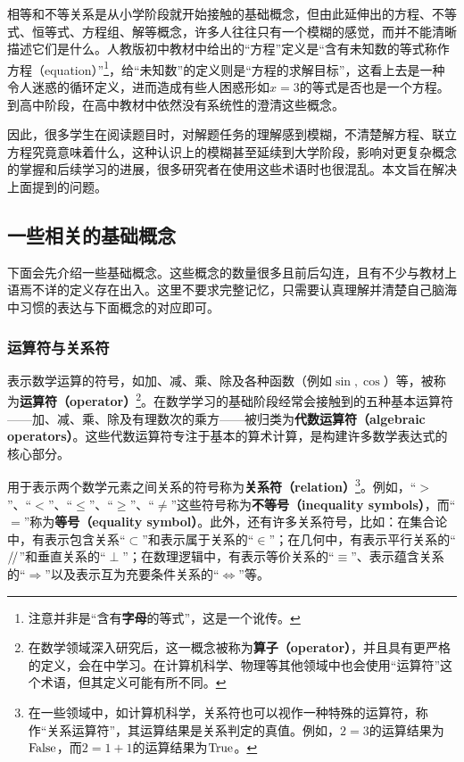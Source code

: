 
\begin{issues}
\issueDraft
\end{issues}


相等和不等关系是从小学阶段就开始接触的基础概念，但由此延伸出的方程、不等式、恒等式、方程组、解等概念，许多人往往只有一个模糊的感觉，而并不能清晰描述它们是什么。人教版初中教材中给出的“方程”定义是“含有未知数的等式称作方程（equation）”\footnote{注意并非是“含有\textbf{字母}的等式”，这是一个讹传。}，给“未知数”的定义则是“方程的求解目标”，这看上去是一种令人迷惑的循环定义，进而造成有些人困惑形如$x=3$的等式是否也是一个方程。到高中阶段，在高中教材中依然没有系统性的澄清这些概念。

因此，很多学生在阅读题目时，对解题任务的理解感到模糊，不清楚解方程、联立方程究竟意味着什么，这种认识上的模糊甚至延续到大学阶段，影响对更复杂概念的掌握和后续学习的进展，很多研究者在使用这些术语时也很混乱。本文旨在解决上面提到的问题。

\subsection{一些相关的基础概念}

下面会先介绍一些基础概念。这些概念的数量很多且前后勾连，且有不少与教材上语焉不详的定义存在出入。这里不要求完整记忆，只需要认真理解并清楚自己脑海中习惯的表达与下面概念的对应即可。

\subsubsection{运算符与关系符}

表示数学运算的符号，如加、减、乘、除及各种函数（例如$\sin,\cos$）等，被称为\textbf{运算符（operator）}\footnote{在数学领域深入研究后，这一概念被称为\textbf{算子（operator）}，并且具有更严格的定义，会在中学习。在计算机科学、物理等其他领域中也会使用“运算符”这个术语，但其定义可能有所不同。}。在数学学习的基础阶段经常会接触到的五种基本运算符——加、减、乘、除及有理数次的乘方——被归类为\textbf{代数运算符（algebraic operators）}。这些代数运算符专注于基本的算术计算，是构建许多数学表达式的核心部分。

用于表示两个数学元素之间关系的符号称为\textbf{关系符（relation）}\footnote{在一些领域中，如计算机科学，关系符也可以视作一种特殊的运算符，称作“关系运算符”，其运算结果是关系判定的真值。例如，$2=3$的运算结果为$\rm False$，而$2=1+1$的运算结果为$\rm True$。}。例如，“$>$”、“$<$”、“$\leq$”、“$\geq$”、“$\neq$”这些符号称为\textbf{不等号（inequality symbols）}，而“$=$”称为\textbf{等号（equality symbol）}。此外，还有许多关系符号，比如：在集合论中，有表示包含关系“$\subset$”和表示属于关系的“$\in$”；在几何中，有表示平行关系的“$\mathrel{/\mskip-2.5mu/}$”和垂直关系的“$\perp$”；在数理逻辑中，有表示等价关系的“$\equiv$”、表示蕴含关系的“$\Rightarrow$”以及表示互为充要条件关系的“$\iff$”等。

